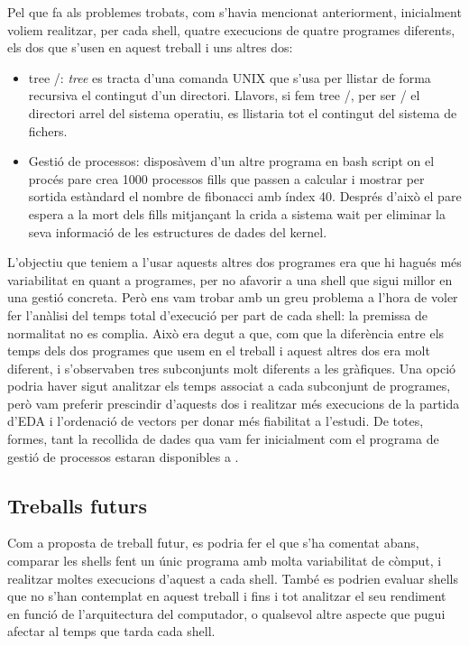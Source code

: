 \documentclass[12pt]{article}
\begin{document}
Pel que fa als problemes trobats, com s'havia mencionat anteriorment, inicialment voliem realitzar, per cada shell, quatre execucions de quatre programes diferents,
els dos que s'usen en aquest treball i uns altres dos:
\begin{itemize}
  \item tree /: \emph{tree} es tracta d'una comanda UNIX que s'usa per llistar de forma recursiva el contingut d'un directori. Llavors, si fem tree /, per ser / el directori
    arrel del sistema operatiu, es llistaria tot el contingut del sistema de fichers.
  \item Gestió de processos: disposàvem d'un altre programa en bash script on el procés pare crea 1000 processos fills que passen a calcular i mostrar per sortida estàndard 
    el nombre de fibonacci amb índex 40. Després d'això el pare espera a la mort dels fills mitjançant la crida a sistema wait per eliminar la seva informació de les 
    estructures de dades del kernel.
\end{itemize} 
L'objectiu que teniem a l'usar aquests altres dos programes era que hi hagués més variabilitat en quant a programes, per no afavorir a una shell que sigui millor en una gestió 
concreta. Però ens vam trobar amb un greu problema a l'hora de voler fer l'anàlisi del temps total d'execució per part de cada shell: la premissa de normalitat no es complia. Això
era degut a que, com que la diferència entre els temps dels dos programes que usem en el treball i aquest altres dos era molt diferent, i s'observaben tres subconjunts molt diferents 
a les gràfiques. Una opció podria haver sigut analitzar els temps associat a cada subconjunt de programes, però vam preferir prescindir d'aquests dos i realitzar més execucions
de la partida d'EDA i l'ordenació de vectors per donar més fiabilitat a l'estudi. De totes, formes, tant la recollida de dades qua vam fer inicialment com el programa de gestió
de processos estaran disponibles a .
\break
\subsection{Treballs futurs}
Com a proposta de treball futur, es podria fer el que s'ha comentat abans, comparar les shells fent un únic programa amb molta variabilitat de còmput, i realitzar moltes
execucions d'aquest a cada shell. També es podrien evaluar shells que no s'han contemplat en aquest treball i fins i tot analitzar el seu rendiment en funció de l'arquitectura
del computador, o qualsevol altre aspecte que pugui afectar al temps que tarda cada shell.
\end{document}
